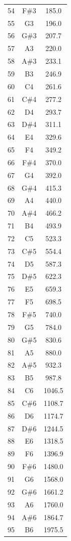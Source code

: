 \documentclass[10pt]{book}
\begin{document}
\begin{CJK}{UTF8}{gkai}
\begin{spacing}{0.99}
\begin{supertabular}{ccc}
54  & F\#3 & 185.0  \\
55  & G3  & 196.0  \\
56  & G\#3 & 207.7  \\
57  & A3  & 220.0  \\
58  & A\#3 & 233.1  \\
59  & B3  & 246.9  \\
60  & C4  & 261.6  \\
61  & C\#4 & 277.2  \\
62  & D4  & 293.7  \\
63  & D\#4 & 311.1  \\
64  & E4  & 329.6  \\
65  & F4  & 349.2  \\
66  & F\#4 & 370.0  \\
67  & G4  & 392.0  \\
68  & G\#4 & 415.3  \\
69  & A4  & 440.0  \\
70  & A\#4 & 466.2  \\
71  & B4  & 493.9  \\
72  & C5  & 523.3  \\
73  & C\#5 & 554.4  \\
74  & D5  & 587.3  \\
75  & D\#5 & 622.3  \\
76  & E5  & 659.3  \\
77  & F5  & 698.5  \\
78  & F\#5 & 740.0  \\
79  & G5  & 784.0  \\
80  & G\#5 & 830.6  \\
81  & A5  & 880.0  \\
82  & A\#5 & 932.3  \\
83  & B5  & 987.8  \\
84  & C6  & 1046.5 \\
85  & C\#6 & 1108.7 \\
86  & D6  & 1174.7 \\
87  & D\#6 & 1244.5 \\
88  & E6  & 1318.5 \\
89  & F6  & 1396.9 \\
90  & F\#6 & 1480.0 \\
91  & G6  & 1568.0 \\
92  & G\#6 & 1661.2 \\
93  & A6  & 1760.0 \\
94  & A\#6 & 1864.7 \\
95  & B6  & 1975.5 \\

\end{supertabular}
\end{spacing}
\end{CJK}
\end{document}
